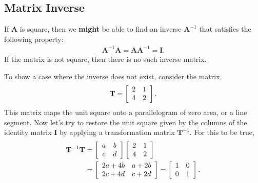 \subsection{Matrix Inverse} \label{Sec:linearAlgebra_Matrices_MatrixInverse}

If $\mathbf{A}$ is square, then we {\bf might} be able to find an inverse $\mathbf{A}^{-1}$ that satisfies the following property:
\begin{align}
  \mathbf{A}^{-1} \mathbf{A} = \mathbf{A} \mathbf{A}^{-1} = \mathbf{I}.
\end{align}
If the matrix is not square, then there is no such inverse matrix.

To show a case where the inverse does not exist, consider the matrix
\begin{align}
  \mathbf{T} = 
  \left[ \begin{array}{c c}  2 &  1 \\
  							 4 &  2 \\ \end{array} \right] . \nonumber 
\end{align}
This matrix maps the unit square onto a parallelogram of zero area, or a line segment. Now let's try to restore the unit square given by the columns of the identity matrix $\mathbf{I}$ by applying a transformation matrix $\mathbf{T}^{-1}$. For this to be true,
\begin{align}
  \mathbf{T}^{-1} \mathbf{T} &= 
     \left[ \begin{array}{c c}  a &  b \\
  							    c &  d \\ \end{array} \right]
     \left[ \begin{array}{c c}  2 &  1 \\
  				  			    4 &  2 \\ \end{array} \right] \nonumber \\
  &= \left[ \begin{array}{c c}  2a + 4b &  a + 2b \\
  				  			    2c + 4d &  c + 2d \\ \end{array} \right] 
   = \left[ \begin{array}{c c}  1 &  0 \\
  				  			    0 &  1 \\ \end{array} \right] .				   
\end{align}
